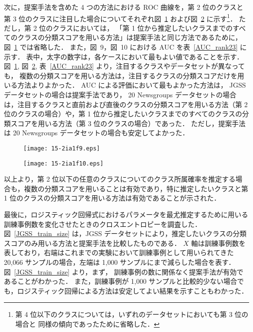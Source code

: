 \documentclass[japanese]{jnlp_1.4}
\begin{document}
次に，提案手法を含めた 4 つの方法における ROC 曲線を，第 2 位のクラスと第 3 位のクラスに注目した場合についてそれぞれ図~\ref{ROC2} および図~\ref{ROC3} に示す\footnote{
	第 4 位以下のクラスについては，いずれのデータセットにおいても第 3 位の場合と
	同様の傾向であったために省略した．
}．
ただし，第 2 位のクラスにおいては，
「第 1 位から推定したいクラスまでのすべてのクラスの分類スコアを用いる方法」は提案手法と同じ方法であるために，図~\ref{ROC2} では省略した．
また，図~9，図~10 における AUC を表~\ref{AUC_rank23} に示す．
表中，太字の数字は，各ケースにおいて最もよい値であることを示す．
図~\ref{ROC2}, 図~\ref{ROC3}, 表~\ref{AUC_rank23} より，注目するクラスやデータセットが異なっても，
複数の分類スコアを用いる方法は，注目するクラスの分類スコアだけを用いる方法よりよかった．
AUC による評価において最もよかった方法は，
JGSS データセットの場合は提案手法であり，
20 Newsgroups データセットの場合は，注目するクラスと直前および直後のクラスの分類スコアを用いる方法（第 2 位のクラスの場合）や，第 1 位から推定したいクラスまでのすべてのクラスの分類スコアを用いる方法（第 3 位のクラスの場合）であった．
ただし，提案手法は 20 Newsgroups データセットの場合も安定してよかった．

\begin{figure}[b]
\begin{center}
\texttt{[image: 15-2ia1f9.eps]}
\label{ROC2}
\end{center}
\end{figure}
\begin{figure}[b]
\begin{center}
\texttt{[image: 15-2ia1f10.eps]}
\label{ROC3}
\end{center}
\end{figure}

以上より，第 2 位以下の任意のクラスについてのクラス所属確率を推定する場合も，複数の分類スコアを用いることは有効であり，特に推定したいクラスと第 1 位のクラスの分類スコアを用いる方法は有効であることが示された．

最後に，ロジスティック回帰式におけるパラメータを最尤推定するために用いる訓練事例数を変化させたときのクロスエントロピーを調査した．
図~\ref{JGSS_train_size} は，JGSS データセットにより，推定したいクラスの分類スコアのみ用いる方法と提案手法を比較したものである．
$X$ 軸は訓練事例数を表しており，右端はこれまでの実験において訓練事例として用いられてきた 20,066 サンプルの場合，左端は 1,000 サンプルにまで減らした場合を表す．
図~\ref{JGSS_train_size} より，まず，
訓練事例の数に関係なく提案手法が有効であることがわかった．
また，訓練事例が 1,000 サンプルと比較的少ない場合でも，ロジスティック回帰による方法は安定してよい結果を示すこともわかった．
\end{document}
